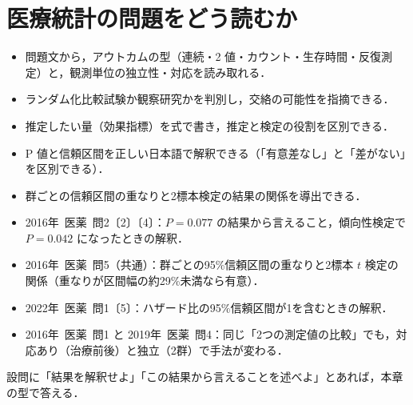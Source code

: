 \documentclass[a4paper,11pt,openany]{ltjsbook}
\newcommand{\kakomon}[2]{\mbox{#1年 医薬 問#2}}
\begin{document}
\clearpage\makeatletter\@mainmattertrue\makeatother
{}

\chapter{医療統計の問題をどう読むか}\label{ch:01}

\begin{goalbox}
\begin{itemize}
\item 問題文から，アウトカムの型（連続・2 値・カウント・生存時間・反復測定）と，観測単位の独立性・対応を読み取れる．
\item ランダム化比較試験か観察研究かを判別し，交絡の可能性を指摘できる．
\item 推定したい量（効果指標）を式で書き，推定と検定の役割を区別できる．
\item P 値と信頼区間を正しい日本語で解釈できる（「有意差なし」と「差がない」を区別できる）．
\item 群ごとの信頼区間の重なりと2標本検定の結果の関係を導出できる．
\end{itemize}
\end{goalbox}

\begin{exambox}
\begin{itemize}
\item \kakomon{2016}{2}〔2〕〔4〕：$P=0.077$ の結果から言えること，傾向性検定で $P=0.042$ になったときの解釈．
\item \kakomon{2016}{5}（共通）：群ごとの95\%信頼区間の重なりと2標本 $t$ 検定の関係（重なりが区間幅の約29\%未満なら有意）．
\item \kakomon{2022}{1}〔5〕：ハザード比の95\%信頼区間が1を含むときの解釈．
\item \kakomon{2016}{1} と \kakomon{2019}{4}：同じ「2つの測定値の比較」でも，対応あり（治療前後）と独立（2群）で手法が変わる．
\end{itemize}
設問に「結果を解釈せよ」「この結果から言えることを述べよ」とあれば，本章の型で答える．
\end{exambox}
\end{document}
